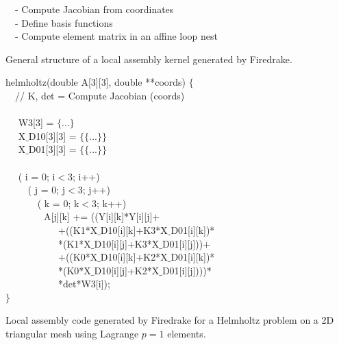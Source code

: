 \documentclass[conference]{IEEEtran}
\begin{document}
\begin{algorithm}[t]
\footnotesize
{}
~~- Compute Jacobian from coordinates \\
~~- Define basis functions \\
~~- Compute element matrix in an affine loop nest
\caption{General structure of a local assembly kernel generated by Firedrake.}
\label{code:general-structure}
\end{algorithm}

\begin{algorithm}[t]
\footnotesize
{} helmholtz(double A[3][3], double **coords) $\lbrace$\\
~~// K, det = Compute Jacobian (coords) \\
~~\\
~~ W3[3] = $\lbrace$...$\rbrace$\\
~~ X$\_$D10[3][3] = $\lbrace\lbrace$...$\rbrace\rbrace$\\
~~ X$\_$D01[3][3] = $\lbrace\lbrace$...$\rbrace\rbrace$\\
~~\\
~~ ( i = 0; i$<$3; i++) \\
~~~~ ( j = 0; j$<$3; j++) \\
~~~~~~ ( k = 0; k$<$3; k++) \\
~~~~~~~~A[j][k] += ((Y[i][k]*Y[i][j]+\\
~~~~~~~~~~~+((K1*X$\_$D10[i][k]+K3*X$\_$D01[i][k])*\\
~~~~~~~~~~~*(K1*X$\_$D10[i][j]+K3*X$\_$D01[i][j]))+\\
~~~~~~~~~~~+((K0*X$\_$D10[i][k]+K2*X$\_$D01[i][k])*\\
~~~~~~~~~~~*(K0*X$\_$D10[i][j]+K2*X$\_$D01[i][j])))*\\
~~~~~~~~~~~*det*W3[i]);\\
$\rbrace$
\caption{Local assembly code generated by Firedrake for a Helmholtz problem on a 2D triangular mesh using Lagrange $p=1$ elements.}
\label{code:helmholtz}
\end{algorithm}
\end{document}
